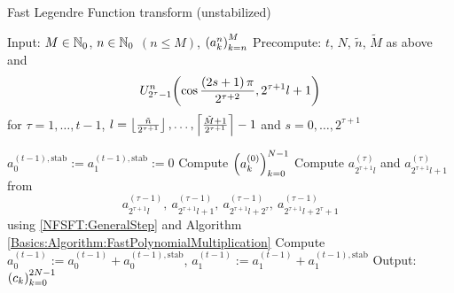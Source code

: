 \begin{algorithm}[htb]
  \caption{Fast Legendre Function transform (unstabilized)}
  \label{NFSFT:Algorithm:FLFT_unstab}    
  \begin{algorithmic}
    \STATE Input:  $M \in \mathbb{N}_{0}$, $n \in \mathbb{N}_{0}$ $(n \le M)$, $\left(a_k^n\right)_{k=n}^{M}$
    \STATE Precompute: $t$, $N$, $\tilde{n}$, $\tilde{M}$ as above and $$U_{2^{\tau}-1}^{n}{\hspace{-0.4ex}}\left(\cos \frac{\left(2s+1\right)\pi}{2^{\tau+2}}, 2^{\tau+1}l+1\right)$$ 
    \STATE {} for $\tau = 1,\ldots,t-1$, $l = \left\lfloor\frac{\tilde{n}}{2^{\tau+1}}\right\rfloor,\ldots,\left\lceil\frac{\tilde{M}+1}{2^{\tau+1}}\right\rceil-1$ and $s = 0,\ldots,2^{\tau+1}$
    \STATE {} 

    \STATE $a_{0}^{(t-1),\text{stab}} := a_{1}^{(t-1),\text{stab}} := 0$
    \STATE Compute $\left(a_{k}^{(0)}\right)_{k=0}^{N-1}$ 
        \STATE Compute $a_{2^{\tau+1}l}^{(\tau)}$ and $a_{2^{\tau+1}l+1}^{(\tau)}$ from $$a_{2^{\tau+1}l}^{(\tau-1)},\  
          a_{2^{\tau+1}l+1}^{(\tau-1)},\ a_{2^{\tau+1}l+2^{\tau}}^{(\tau-1)},\ a_{2^{\tau+1}l+2^{\tau}+1}^{(\tau-1)}$$ using 
          \eqref{NFSFT:GeneralStep} and Algorithm \ref{Basics:Algorithm:FastPolynomialMultiplication}
      \ENDFOR
    \ENDFOR
    \STATE Compute $a_{0}^{(t-1)} := a_{0}^{(t-1)} + a_{0}^{(t-1),\text{stab}}$, $a_{1}^{(t-1)} := a_{1}^{(t-1)} + a_{1}^{(t-1),\text{stab}}$
    \STATE Output: $\left(c_{k}\right)_{k=0}^{2N-1}$
\end{algorithmic}
\end{algorithm}

